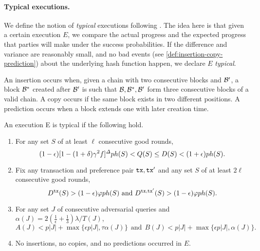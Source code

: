 \paragraph{Typical executions.}
%
We define the notion of \emph{typical} executions following \cite{C:GarKiaLeo17,EPRINT:GarKiaLeo20}.
%
The idea here is that given a certain execution $E$, we compare the actual progress and the expected progress that parties will make under the success probabilities.
%
If the difference and variance are reasonably small, and no bad events (see \cref{def:insertion-copy-prediction}) about the underlying hash function happen, we declare $E$ \emph{typical}.

\begin{definition} \label{def:insertion-copy-prediction}
    An insertion occurs when, given a chain \chain with two consecutive blocks \block and $\mathcal{B}'$, a block $\mathcal{B}^*$ created after $\mathcal{B}'$ is such that $\mathcal{B}, \mathcal{B}^*, \mathcal{B}'$ form three consecutive blocks of a valid chain.
    A copy occurs if the same block exists in two different positions.
    A prediction occurs when a block extends one with later creation time.
\end{definition}

\begin{definition}
    \label{def:typical-execution}

    An execution E is typical if the following hold.
    \begin{enumerate}[label=(\alph*), leftmargin=*, noitemsep]
        \item For any set $S$ of at least $\ell$ consecutive good rounds,
              \[(1 - \epsilon)[1 - (1 + \delta) \gamma^2 f]^\varDelta p h(S) < Q(S) \le D(S) < (1 + \epsilon) p h(S). \]

        \item Fix any transaction \tx and preference pair $\mathtt{tx}, \mathtt{tx}'$ and any set $S$ of at least $2\ell$ consecutive good rounds,
              \[ D^{\mathtt{tx}}(S) > (1 - \epsilon) \varphi p h(S) \text{ and } D^{\mathtt{tx}, \mathtt{tx}'}(S) > (1 - \epsilon) \varphi p h(S). \]

        \item For any set $J$ of consecutive adversarial queries and $\alpha(J) = 2(\frac{1}{\epsilon} + \frac{1}{3})\lambda / T(J)$,
              \[ A(J) < p|J| + \max \{\epsilon p |J|, \tau \alpha(J)\} ~~\text{and}~~ B(J)< p|J| + \max \{\epsilon p |J|, \alpha(J)\}. \]

        \item No insertions, no copies, and no predictions occurred in $E$.
    \end{enumerate}
\end{definition}

